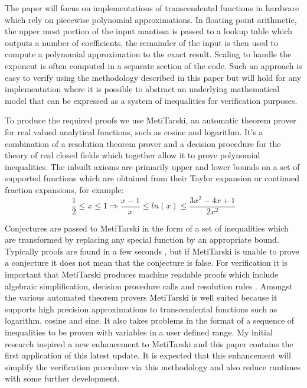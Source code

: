 \documentclass[a4]{article}
\begin{document}
The paper will focus on implementations of transcendental functions in hardware which rely on piecewise polynomial approximations. In floating point arithmetic, the upper most portion of the input mantissa is passed to a lookup table which outputs a number of coefficients, the remainder of the input is then used to compute a polynomial approximation to the exact result. Scaling to handle the exponent is often computed in a separate section of the code. Such an approach is easy to verify using the methodology described in this paper but will hold for any implementation where it is possible to abstract an underlying mathematical model that can be expressed as a system of inequalities for verification purposes.

To produce the required proofs we use MetiTarski, an automatic theorem prover \cite{akbarpour2010metitarski} for real valued analytical functions, such as cosine and logarithm. It's a combination of a resolution theorem prover and a decision procedure for the theory of real closed fields which together allow it to prove polynomial inequalities. The inbuilt axioms are primarily upper and lower bounds on a set of supported functions which are obtained from their Taylor expansion or continued fraction expansions, for example:
$$\frac{1}{2} \leq x \leq 1 \Rightarrow \frac{x-1}{x} \leq ln(x) \leq \frac{3x^2-4x+1}{2x^2}$$

Conjectures are passed to MetiTarski in the form of a set of inequalities which are transformed by replacing any special function by an appropriate bound. Typically proofs are found in a few seconds \cite{akbarpour2009applications}, but if MetiTarski is unable to prove a conjecture it does not mean that the conjecture is false. For verification it is important that MetiTarski produces machine readable proofs which include algebraic simplification, decision procedure calls and resolution rules \cite{denman2009formal}. Amongst the various automated theorem provers MetiTarski is well suited because it supports high precision approximations to transcendental functions such as logarithm, cosine and sine. It also takes problems in the format of a sequence of inequalities to be proven with variables in a user defined range. My initial research inspired a new enhancement to MetiTarski and this paper contains the first application of this latest update. It is expected that this enhancement will simplify the verification procedure via this methodology and also reduce runtimes with some further development. 
\end{document}
